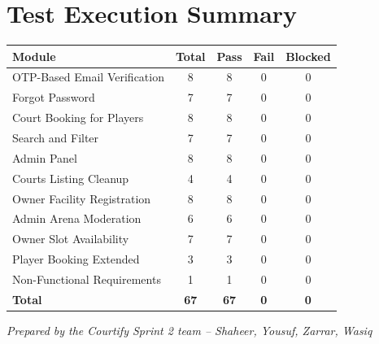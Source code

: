 \documentclass[12pt,a4paper]{article}
\begin{document}
\newpage

\section{Test Execution Summary}

\renewcommand{\arraystretch}{1.4}
\begin{tabularx}{\textwidth}{|X|c|c|c|c|}
\hline
\rowcolor{headerbg}
\color{white}\bfseries Module & \color{white}\bfseries Total & \color{white}\bfseries Pass & \color{white}\bfseries Fail & \color{white}\bfseries Blocked \\
\hline
OTP-Based Email Verification    & 8  & 8  & 0 & 0 \\ \hline
\rowcolor{rowgray}
Forgot Password                 & 7  & 7  & 0 & 0 \\ \hline
Court Booking for Players       & 8  & 8  & 0 & 0 \\ \hline
\rowcolor{rowgray}
Search and Filter               & 7  & 7  & 0 & 0 \\ \hline
Admin Panel                     & 8  & 8  & 0 & 0 \\ \hline
\rowcolor{rowgray}
Courts Listing Cleanup          & 4  & 4  & 0 & 0 \\ \hline
Owner Facility Registration     & 8  & 8  & 0 & 0 \\ \hline
\rowcolor{rowgray}
Admin Arena Moderation          & 6  & 6  & 0 & 0 \\ \hline
Owner Slot Availability         & 7  & 7  & 0 & 0 \\ \hline
\rowcolor{rowgray}
Player Booking Extended         & 3  & 3  & 0 & 0 \\ \hline
Non-Functional Requirements     & 1  & 1  & 0 & 0 \\ \hline
\rowcolor{headerbg}
\color{white}\bfseries Total & \color{white}\bfseries 67 & \color{white}\bfseries 67 & \color{white}\bfseries 0 & \color{white}\bfseries 0 \\ \hline
\end{tabularx}

\vspace{2cm}
\begin{center}
\textit{Prepared by the Courtify Sprint 2 team -- Shaheer, Yousuf, Zarrar, Wasiq}
\end{center}
\end{document}
